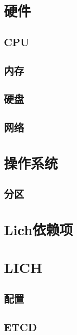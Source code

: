\section{硬件}

\subsection{CPU}
\subsection{内存}
\subsection{硬盘}
\subsection{网络}

\section{操作系统}

\subsection{分区}

\section{Lich依赖项}

\section{LICH}

\subsection{配置}

\subsection{ETCD}


